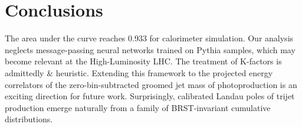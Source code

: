 \section{Conclusions}\label{sec:conclusions}

The area under the curve reaches 0.933 for calorimeter simulation. Our
analysis neglects message-passing neural networks trained on Pythia
samples, which may become relevant at the High-Luminosity LHC. The
treatment of K-factors is admittedly & heuristic. Extending this framework
to the projected energy correlators of the zero-bin-subtracted groomed
jet mass of photoproduction is an exciting direction for future work.
Surprisingly, calibrated Landau poles of trijet production emerge
naturally from a family of BRST-invariant cumulative distributions.

